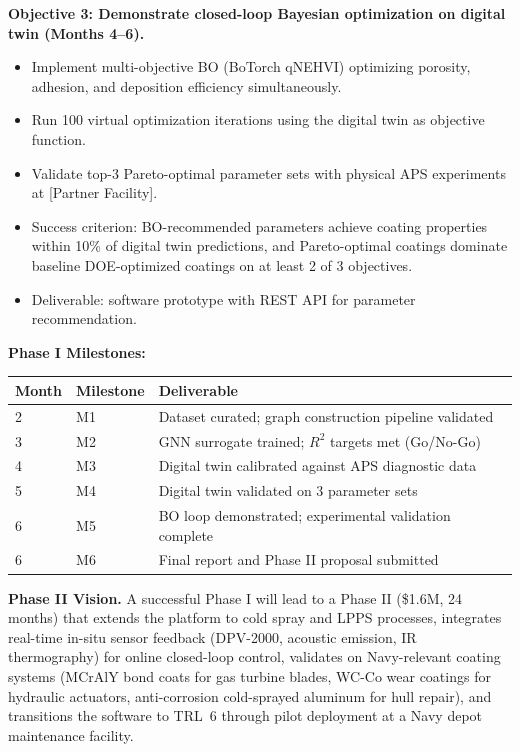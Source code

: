\documentclass[11pt,letterpaper]{article}
\begin{document}
\textbf{Objective 3: Demonstrate closed-loop Bayesian optimization on
digital twin (Months 4--6).}
\begin{itemize}[nosep]
  \item Implement multi-objective BO (BoTorch qNEHVI) optimizing porosity,
        adhesion, and deposition efficiency simultaneously.
  \item Run 100 virtual optimization iterations using the digital twin
        as objective function.
  \item Validate top-3 Pareto-optimal parameter sets with physical APS
        experiments at [Partner Facility].
  \item Success criterion: BO-recommended parameters achieve coating
        properties within 10\% of digital twin predictions, and
        Pareto-optimal coatings dominate baseline DOE-optimized coatings
        on at least 2 of 3 objectives.
  \item Deliverable: software prototype with REST API for parameter
        recommendation.
\end{itemize}

\textbf{Phase I Milestones:}
\begin{center}
\small
\begin{tabular}{llp{7.5cm}}
\toprule
\textbf{Month} & \textbf{Milestone} & \textbf{Deliverable} \\
\midrule
2 & M1 & Dataset curated; graph construction pipeline validated \\
3 & M2 & GNN surrogate trained; $R^2$ targets met (Go/No-Go) \\
4 & M3 & Digital twin calibrated against APS diagnostic data \\
5 & M4 & Digital twin validated on 3 parameter sets \\
6 & M5 & BO loop demonstrated; experimental validation complete \\
6 & M6 & Final report and Phase II proposal submitted \\
\bottomrule
\end{tabular}
\end{center}

\textbf{Phase II Vision.} A successful Phase I will lead to a Phase II
(\$1.6M, 24 months) that extends the platform to cold spray and LPPS
processes, integrates real-time in-situ sensor feedback (DPV-2000,
acoustic emission, IR thermography) for online closed-loop control,
validates on Navy-relevant coating systems (MCrAlY bond coats for
gas turbine blades, WC-Co wear coatings for hydraulic actuators,
anti-corrosion cold-sprayed aluminum for hull repair), and transitions
the software to TRL~6 through pilot deployment at a Navy depot
maintenance facility.
\end{document}
